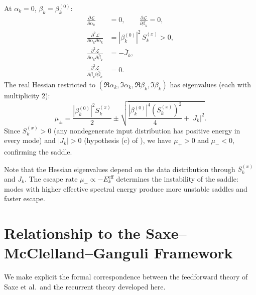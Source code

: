 \documentclass[11pt,a4paper]{article}
\theoremstyle{definition}
\newcommand{\cL}{\mathcal{L}}
\begin{document}
At $\alpha_k = 0$, $\beta_k = \beta_k^{(0)}$:
\begin{align}
  \frac{\partial\cL}{\partial\alpha_k} &= 0, \qquad
  \frac{\partial\cL}{\partial\beta_k} = 0, \\
  \frac{\partial^2\cL}{\partial\alpha_k\partial\bar\alpha_k}
  &= |\beta_k^{(0)}|^2\, S_k^{(x)} > 0, \\
  \frac{\partial^2\cL}{\partial\alpha_k\partial\bar\beta_k}
  &= -\bar{J}_k, \\
  \frac{\partial^2\cL}{\partial\beta_k\partial\bar\beta_k}
  &= 0.
\end{align}
The real Hessian restricted to
$(\Re\alpha_k, \Im\alpha_k, \Re\beta_k, \Im\beta_k)$
has eigenvalues (each with multiplicity 2):
\begin{equation}
  \mu_{\pm} = \frac{|\beta_k^{(0)}|^2 S_k^{(x)}}{2}
  \pm \sqrt{\frac{|\beta_k^{(0)}|^4 (S_k^{(x)})^2}{4}
  + |J_k|^2}.
\end{equation}
Since $S_k^{(x)} > 0$ (any nondegenerate input distribution
has positive energy in every mode) and $|J_k| > 0$
(hypothesis (c) of ), we have $\mu_+ > 0$
and $\mu_- < 0$, confirming the saddle.

Note that the Hessian eigenvalues depend on the data
distribution through $S_k^{(x)}$ and $J_k$. The escape rate
$\mu_- \propto -E_k^{\mathrm{eff}}$ determines the
instability of the saddle: modes with higher effective spectral
energy produce more unstable saddles and faster escape.

\section{Relationship to the Saxe--McClelland--Ganguli Framework}%
\label{app:saxe}

We make explicit the formal correspondence between the feedforward
theory of Saxe et al.\ and the recurrent theory developed here.
\end{document}
